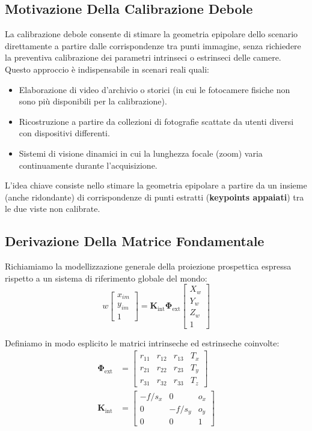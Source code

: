 ﻿\documentclass[11pt, a4paper]{article}
\begin{document}
\subsection{Motivazione Della Calibrazione Debole}

La calibrazione debole consente di stimare la geometria epipolare dello scenario direttamente a partire dalle corrispondenze tra punti immagine, senza richiedere la preventiva calibrazione dei parametri intrinseci o estrinseci delle camere. Questo approccio è indispensabile in scenari reali quali:
\begin{itemize}[noitemsep]
    \item Elaborazione di video d'archivio o storici (in cui le fotocamere fisiche non sono più disponibili per la calibrazione).
    \item Ricostruzione a partire da collezioni di fotografie scattate da utenti diversi con dispositivi differenti.
    \item Sistemi di visione dinamici in cui la lunghezza focale (zoom) varia continuamente durante l'acquisizione.
\end{itemize}

L'idea chiave consiste nello stimare la geometria epipolare a partire da un insieme (anche ridondante) di corrispondenze di punti estratti (\textbf{keypoints appaiati}) tra le due viste non calibrate.



\subsection{Derivazione Della Matrice Fondamentale}

Richiamiamo la modellizzazione generale della proiezione prospettica espressa rispetto a un sistema di riferimento globale del mondo:
\begin{equation}
w \begin{bmatrix} x_{im} \\ y_{im} \\ 1 \end{bmatrix} = \bm{K}_{\text{int}} \bm{\Phi}_{\text{ext}} \begin{bmatrix} X_w \\ Y_w \\ Z_w \\ 1 \end{bmatrix}
\end{equation}

Definiamo in modo esplicito le matrici intrinseche ed estrinseche coinvolte:
\begin{align*}
\bm{\Phi}_{\text{ext}} &= \begin{bmatrix} r_{11} & r_{12} & r_{13} & T_x \\ r_{21} & r_{22} & r_{23} & T_y \\ r_{31} & r_{32} & r_{33} & T_z \end{bmatrix} \\
\bm{K}_{\text{int}} &= \begin{bmatrix} -f/s_x & 0 & o_x \\ 0 & -f/s_y & o_y \\ 0 & 0 & 1 \end{bmatrix}
\end{align*}
\end{document}

